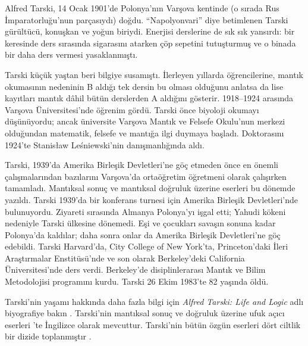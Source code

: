 \documentclass[../../../include/open-logic-section]{subfiles}
\begin{document}



Alfred Tarski, 14 Ocak 1901'de Polonya'nın Varşova kentinde (o sırada Rus
İmparatorluğu'nun parçasıydı) doğdu. ``Napolyonvari'' diye betimlenen Tarski
gürültücü, konuşkan ve yoğun biriydi. Enerjisi derslerine de sık sık yansırdı:
bir keresinde ders sırasında sigarasını atarken çöp sepetini tutuşturmuş ve o
binada bir daha ders vermesi yasaklanmıştı.

Tarski küçük yaştan beri bilgiye susamıştı. İlerleyen yıllarda öğrencilerine,
mantık okumasının nedeninin B aldığı tek dersin bu olması olduğunu anlatsa da
lise kayıtları mantık dâhil bütün derslerden A aldığını gösterir. 1918--1924
arasında Varşova Üniversitesi'nde öğrenim gördü. Tarski önce biyoloji okumayı
düşünüyordu; ancak üniversite Varşova Mantık ve Felsefe Okulu'nun merkezi
olduğundan matematik, felsefe ve mantığa ilgi duymaya başladı. Doktorasını
1924'te Stanis\l{}aw Le\'{s}niewski'nin danışmanlığında aldı.

Tarski, 1939'da Amerika Birleşik Devletleri'ne göç etmeden önce en önemli
çalışmalarından bazılarını Varşova'da ortaöğretim öğretmeni olarak çalışırken
tamamladı. Mantıksal sonuç ve mantıksal doğruluk üzerine eserleri bu dönemde
yazıldı. Tarski 1939'da bir konferans turnesi için Amerika Birleşik
Devletleri'nde bulunuyordu. Ziyareti sırasında Almanya Polonya'yı işgal etti;
Yahudi kökeni nedeniyle Tarski ülkesine dönemedi. Eşi ve çocukları savaşın
sonuna kadar Polonya'da kaldılar; daha sonra onlar da Amerika Birleşik
Devletleri'ne göç edebildi. Tarski Harvard'da, City College of New York'ta,
Princeton'daki İleri Araştırmalar Enstitüsü'nde ve son olarak Berkeley'deki
California Üniversitesi'nde ders verdi. Berkeley'de disiplinlerarası Mantık
ve Bilim Metodolojisi programını kurdu. Tarski 26 Ekim 1983'te 82 yaşında
öldü.

\begin{reading} 
Tarski'nin yaşamı hakkında daha fazla bilgi için \emph{Alfred Tarski: Life
  and Logic} adlı biyografiye bakın \citep{Feferman2004}. Tarski'nin mantıksal
sonuç ve doğruluk üzerine ufuk açıcı eserleri \citep{Tarski1983}'te İngilizce
olarak mevcuttur. Tarski'nin bütün özgün eserleri dört ciltlik bir dizide
toplanmıştır \citep{Tarski1981}.
\end{reading}
\end{document}
